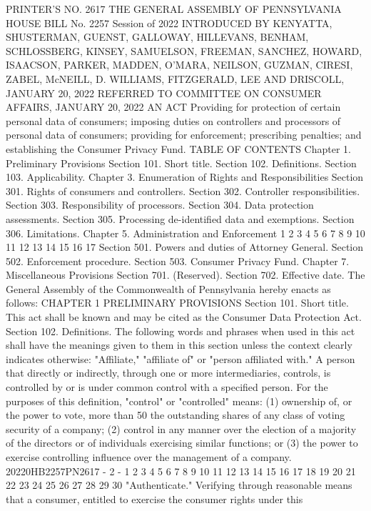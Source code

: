 PRINTER'S NO. 2617
THE GENERAL ASSEMBLY OF PENNSYLVANIA
HOUSE BILL
No. 2257 Session of
2022
INTRODUCED BY KENYATTA, SHUSTERMAN, GUENST, GALLOWAY, HILLEVANS, BENHAM, SCHLOSSBERG, KINSEY, SAMUELSON, FREEMAN,
SANCHEZ, HOWARD, ISAACSON, PARKER, MADDEN, O'MARA, NEILSON,
GUZMAN, CIRESI, ZABEL, McNEILL, D. WILLIAMS, FITZGERALD, LEE
AND DRISCOLL, JANUARY 20, 2022
REFERRED TO COMMITTEE ON CONSUMER AFFAIRS, JANUARY 20, 2022
AN ACT
Providing for protection of certain personal data of consumers;
imposing duties on controllers and processors of personal
data of consumers; providing for enforcement; prescribing
penalties; and establishing the Consumer Privacy Fund.
TABLE OF CONTENTS
Chapter 1. Preliminary Provisions
Section 101. Short title.
Section 102. Definitions.
Section 103. Applicability.
Chapter 3. Enumeration of Rights and Responsibilities
Section 301. Rights of consumers and controllers.
Section 302. Controller responsibilities.
Section 303. Responsibility of processors.
Section 304. Data protection assessments.
Section 305. Processing de-identified data and exemptions.
Section 306. Limitations.
Chapter 5. Administration and Enforcement
1
2
3
4
5
6
7
8
9
10
11
12
13
14
15
16
17
Section 501. Powers and duties of Attorney General.
Section 502. Enforcement procedure.
Section 503. Consumer Privacy Fund.
Chapter 7. Miscellaneous Provisions
Section 701. (Reserved).
Section 702. Effective date.
The General Assembly of the Commonwealth of Pennsylvania
hereby enacts as follows:
CHAPTER 1
PRELIMINARY PROVISIONS
Section 101. Short title.
This act shall be known and may be cited as the Consumer Data
Protection Act.
Section 102. Definitions.
The following words and phrases when used in this act shall
have the meanings given to them in this section unless the
context clearly indicates otherwise:
"Affiliate," "affiliate of" or "person affiliated with." A
person that directly or indirectly, through one or more
intermediaries, controls, is controlled by or is under common
control with a specified person. For the purposes of this
definition, "control" or "controlled" means:
(1) ownership of, or the power to vote, more than 50%
the outstanding shares of any class of voting security of a
company;
(2) control in any manner over the election of a
majority of the directors or of individuals exercising
similar functions; or
(3) the power to exercise controlling influence over the
management of a company.
20220HB2257PN2617 - 2 -
1
2
3
4
5
6
7
8
9
10
11
12
13
14
15
16
17
18
19
20
21
22
23
24
25
26
27
28
29
30
"Authenticate." Verifying through reasonable means that a
consumer, entitled to exercise the consumer rights under this
